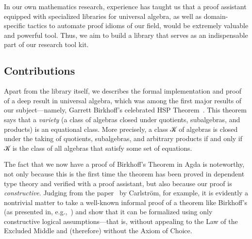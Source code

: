 In our own mathematics research, experience has taught us that a proof assistant equipped with specialized libraries for universal algebra, as well as domain-specific tactics to automate proof idioms of our field, would be extremely valuable and powerful tool. Thus, we aim to build a library that serves as an indispensable part of our research tool kit.



\subsection{Contributions}
\label{sec:contributions}
Apart from the library itself, we describes the formal implementation and proof of a deep result in universal algebra, which was among the first major results of our subject---namely, Garrett Birkhoff's celebrated HSP Theorem~\cite{Birkhoff:1935}.  This theorem says that a \textit{variety} (a class of algebras closed under quotients, subalgebras, and products) is an equational class.  More precisely, a class 𝒦 of algebras is closed under the taking of quotients, subalgebras, and arbitrary products if and only if 𝒦 is the class of all algebras that satisfy some set of equations.

The fact that we now have a proof of Birkhoff's Theorem in Agda is noteworthy, not only because this is the first time the theorem has been proved in dependent type theory and verified with a proof assistant, but also because our proof is \emph{constructive}. Judging from the paper~\cite{Carlstrom:2008} by Carlstr\"om, for example, it is evidently a nontrivial matter to take a well-known informal proof of a theorem like Birkhoff's (as presented in, e.g.,~\cite{Bergman:2012}) and show that it can be formalized using only constructive logical assumptions---that is, without appealing to the Law of the Excluded Middle and (therefore) without the Axiom of Choice.

